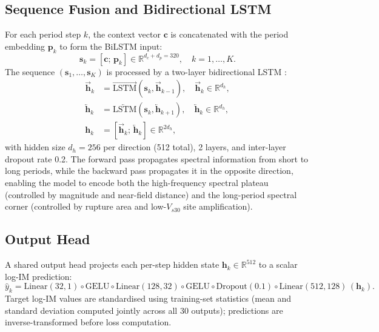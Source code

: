 \documentclass[12pt,a4paper]{article}
\begin{document}
\subsection{Sequence Fusion and Bidirectional LSTM}

For each period step $k$, the context vector $\mathbf{c}$ is concatenated with
the period embedding $\mathbf{p}_k$ to form the BiLSTM input:
\begin{equation}
  \mathbf{s}_k = [\mathbf{c};\, \mathbf{p}_k] \in \mathbb{R}^{d_c + d_p = 320},
  \quad k = 1, \ldots, K.
  \label{eq:fusion}
\end{equation}
The sequence $(\mathbf{s}_1, \ldots, \mathbf{s}_K)$ is processed by a
two-layer bidirectional LSTM \citep{Schuster1997}:
\begin{align}
  \overrightarrow{\mathbf{h}}_k &= \overrightarrow{\mathrm{LSTM}}(\mathbf{s}_k,
    \overrightarrow{\mathbf{h}}_{k-1}),
    \quad \overrightarrow{\mathbf{h}}_k \in \mathbb{R}^{d_h},\\
  \overleftarrow{\mathbf{h}}_k &= \overleftarrow{\mathrm{LSTM}}(\mathbf{s}_k,
    \overleftarrow{\mathbf{h}}_{k+1}),
    \quad \overleftarrow{\mathbf{h}}_k \in \mathbb{R}^{d_h},\\
  \mathbf{h}_k &= [\overrightarrow{\mathbf{h}}_k;\, \overleftarrow{\mathbf{h}}_k]
    \in \mathbb{R}^{2d_h},
  \label{eq:bilstm}
\end{align}
with hidden size $d_h = 256$ per direction (512 total), 2 layers, and inter-layer
dropout rate 0.2.
The forward pass propagates spectral information from short to long periods,
while the backward pass propagates it in the opposite direction, enabling the
model to encode both the high-frequency spectral plateau (controlled by
magnitude and near-field distance) and the long-period spectral corner
(controlled by rupture area and low-$V_{s30}$ site amplification).

\subsection{Output Head}

A shared output head projects each per-step hidden state
$\mathbf{h}_k \in \mathbb{R}^{512}$ to a scalar log-IM prediction:
\begin{equation}
  \hat{y}_k =
  \mathrm{Linear}(32, 1) \circ \mathrm{GELU} \circ
  \mathrm{Linear}(128, 32) \circ \mathrm{GELU} \circ
  \mathrm{Dropout}(0.1) \circ
  \mathrm{Linear}(512, 128)\,(\mathbf{h}_k).
  \label{eq:output_head}
\end{equation}
Target log-IM values are standardised using training-set statistics
(mean and standard deviation computed jointly across all 30 outputs);
predictions are inverse-transformed before loss computation.
\end{document}
